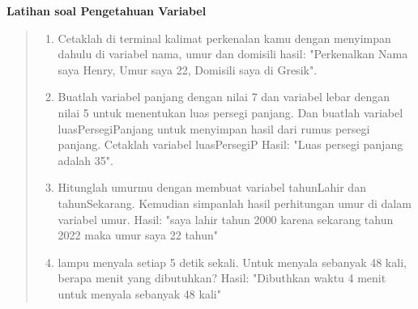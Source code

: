 \documentclass[a4paper, 12pt]{article}
\begin{document}
\begin{titlepage}
    \vspace*{\fill}
    \begin{center}
        \Large \textbf{Latihan soal Pengetahuan Variabel} \\[0.5cm]
    \end{center}
    \vspace*{\fill}
\end{titlepage}

\begin{quote}
\begin{enumerate}

    \item Cetaklah di terminal kalimat perkenalan kamu dengan menyimpan dahulu di variabel nama, umur dan domisili 
    hasil: "Perkenalkan Nama saya Henry, Umur saya 22, Domisili saya di Gresik".

    \item Buatlah variabel panjang dengan nilai 7 dan variabel lebar dengan nilai 5 untuk menentukan luas persegi panjang. Dan buatlah variabel luasPersegiPanjang untuk menyimpan hasil dari rumus persegi panjang.
    Cetaklah variabel luasPersegiP Hasil: "Luas persegi panjang adalah 35".
    
    \item Hitunglah umurmu dengan membuat variabel tahunLahir dan tahunSekarang. Kemudian simpanlah hasil perhitungan umur di dalam variabel umur. Hasil: "saya lahir tahun 2000 karena sekarang tahun 2022 maka umur saya 22 tahun"
    
    \item lampu menyala setiap 5 detik sekali. Untuk menyala sebanyak 48 kali, berapa menit yang dibutuhkan? Hasil: "Dibuthkan waktu 4 menit untuk menyala sebanyak 48 kali" 

\end{enumerate}
\end{quote}
\end{document}
